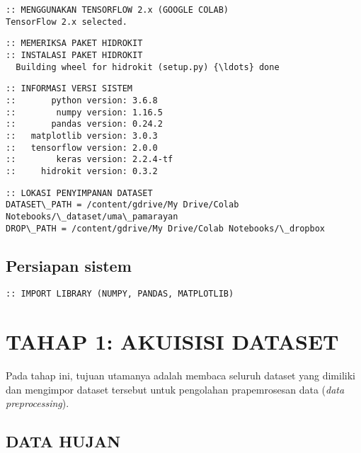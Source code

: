 \documentclass[11pt]{article}
\let\oldsection\section
\renewcommand\section{\clearpage\oldsection}
\begin{document}
    \begin{Verbatim}[commandchars=\\\{\}]
:: MENGGUNAKAN TENSORFLOW 2.x (GOOGLE COLAB)
TensorFlow 2.x selected.
    \end{Verbatim}

    \begin{Verbatim}[commandchars=\\\{\}]
:: MEMERIKSA PAKET HIDROKIT
:: INSTALASI PAKET HIDROKIT
  Building wheel for hidrokit (setup.py) {\ldots} done
    \end{Verbatim}

    \begin{Verbatim}[commandchars=\\\{\}]
:: INFORMASI VERSI SISTEM
::       python version: 3.6.8
::        numpy version: 1.16.5
::       pandas version: 0.24.2
::   matplotlib version: 3.0.3
::   tensorflow version: 2.0.0
::        keras version: 2.2.4-tf
::     hidrokit version: 0.3.2
    \end{Verbatim}

    \begin{Verbatim}[commandchars=\\\{\}]
:: LOKASI PENYIMPANAN DATASET
DATASET\_PATH = /content/gdrive/My Drive/Colab Notebooks/\_dataset/uma\_pamarayan
DROP\_PATH = /content/gdrive/My Drive/Colab Notebooks/\_dropbox
    \end{Verbatim}

    \hypertarget{persiapan-sistem}{%
\subsection{Persiapan sistem}\label{persiapan-sistem}}

    \begin{Verbatim}[commandchars=\\\{\}]
:: IMPORT LIBRARY (NUMPY, PANDAS, MATPLOTLIB)
    \end{Verbatim}

    \hypertarget{tahap-1-akuisisi-dataset}{%
\section{TAHAP 1: AKUISISI DATASET}\label{tahap-1-akuisisi-dataset}}

Pada tahap ini, tujuan utamanya adalah membaca seluruh dataset yang
dimiliki dan mengimpor dataset tersebut untuk pengolahan prapemrosesan
data (\emph{data preprocessing}).

    \hypertarget{data-hujan}{%
\subsection{DATA HUJAN}\label{data-hujan}}
\end{document}
